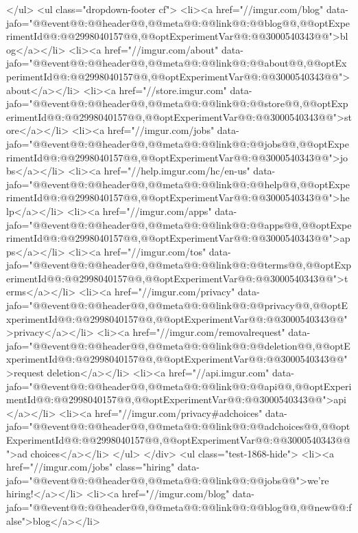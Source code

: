                             </ul>
                            <ul class="dropdown-footer cf">
                                <li><a href="//imgur.com/blog" data-jafo="{@@event@@:@@header@@,@@meta@@:{@@link@@:@@blog@@,@@optExperimentId@@:@@2998040157@@,@@optExperimentVar@@:@@3000540343@@}}">blog</a></li>
                                <li><a href="//imgur.com/about"  data-jafo="{@@event@@:@@header@@,@@meta@@:{@@link@@:@@about@@,@@optExperimentId@@:@@2998040157@@,@@optExperimentVar@@:@@3000540343@@}}">about</a></li>
                                <li><a href="//store.imgur.com" data-jafo="{@@event@@:@@header@@,@@meta@@:{@@link@@:@@store@@,@@optExperimentId@@:@@2998040157@@,@@optExperimentVar@@:@@3000540343@@}}">store</a></li>
                                <li><a href="//imgur.com/jobs"  data-jafo="{@@event@@:@@header@@,@@meta@@:{@@link@@:@@jobs@@,@@optExperimentId@@:@@2998040157@@,@@optExperimentVar@@:@@3000540343@@}}">jobs</a></li>
                                <li><a href="//help.imgur.com/hc/en-us" data-jafo="{@@event@@:@@header@@,@@meta@@:{@@link@@:@@help@@,@@optExperimentId@@:@@2998040157@@,@@optExperimentVar@@:@@3000540343@@}}">help</a></li>
                                <li><a href="//imgur.com/apps"  data-jafo="{@@event@@:@@header@@,@@meta@@:{@@link@@:@@apps@@,@@optExperimentId@@:@@2998040157@@,@@optExperimentVar@@:@@3000540343@@}}">apps</a></li>
                                <li><a href="//imgur.com/tos"  data-jafo="{@@event@@:@@header@@,@@meta@@:{@@link@@:@@terms@@,@@optExperimentId@@:@@2998040157@@,@@optExperimentVar@@:@@3000540343@@}}">terms</a></li>
                                <li><a href="//imgur.com/privacy"  data-jafo="{@@event@@:@@header@@,@@meta@@:{@@link@@:@@privacy@@,@@optExperimentId@@:@@2998040157@@,@@optExperimentVar@@:@@3000540343@@}}">privacy</a></li>
                                <li><a href="//imgur.com/removalrequest" data-jafo="{@@event@@:@@header@@,@@meta@@:{@@link@@:@@deletion@@,@@optExperimentId@@:@@2998040157@@,@@optExperimentVar@@:@@3000540343@@}}">request deletion</a></li>
                                <li><a href="//api.imgur.com" data-jafo="{@@event@@:@@header@@,@@meta@@:{@@link@@:@@api@@,@@optExperimentId@@:@@2998040157@@,@@optExperimentVar@@:@@3000540343@@}}">api</a></li>
                                <li><a href="//imgur.com/privacy#adchoices" data-jafo="{@@event@@:@@header@@,@@meta@@:{@@link@@:@@adchoices@@,@@optExperimentId@@:@@2998040157@@,@@optExperimentVar@@:@@3000540343@@}}">ad choices</a></li>
                            </ul>
                        </div>
                        <ul class="test-1868-hide">
                            <li><a href="//imgur.com/jobs" class="hiring" data-jafo="{@@event@@:@@header@@,@@meta@@:{@@link@@:@@jobs@@}}">we're hiring!</a></li>
                                                            <li><a href="//imgur.com/blog" data-jafo="{@@event@@:@@header@@,@@meta@@:{@@link@@:@@blog@@,@@new@@:false}}">blog</a></li>
                            
